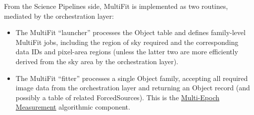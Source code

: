 From the Science Pipelines side, MultiFit is implemented as two routines, mediated by the orchestration layer:
\begin{itemize}
\item The MultiFit ``launcher'' processes the Object table and defines family-level MultiFit jobs, including the region of sky required and the corresponding data IDs and pixel-area regions (unless the latter two are more efficiently derived from the sky area by the orchestration layer).
\item The MultiFit ``fitter'' processes a single Object family, accepting all required image data from the orchestration layer and returning an Object record (and possibly a table of related ForcedSources).  This is the \hyperref[sec:acMultiEpochMeasurement]{Multi-Epoch Measurement} algorithmic component.
\end{itemize}

